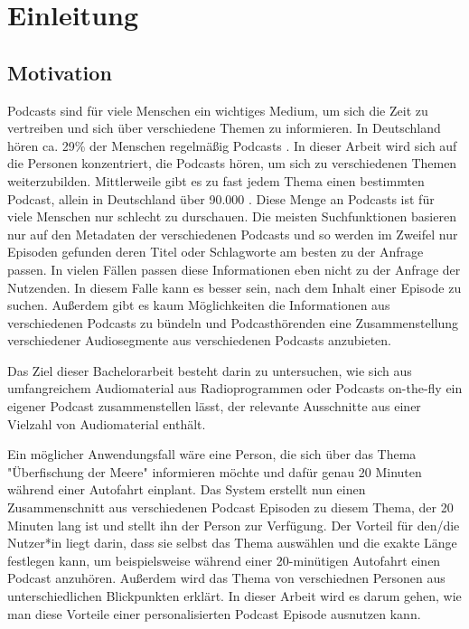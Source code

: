 \chapter{Einleitung}\label{ch:intro}

\section{Motivation}

Podcasts sind für viele Menschen ein wichtiges Medium, um sich die Zeit zu vertreiben und sich über verschiedene Themen zu informieren. 
In Deutschland hören ca. 29\% der Menschen regelmäßig Podcasts \cite{newman2022}.
In dieser Arbeit wird sich auf die Personen konzentriert, die Podcasts hören, um sich zu verschiedenen Themen weiterzubilden.
Mittlerweile gibt es zu fast jedem Thema einen bestimmten Podcast, allein in Deutschland über 90.000 \cite{listennotes}.
Diese Menge an Podcasts ist für viele Menschen nur schlecht zu durschauen.
Die meisten Suchfunktionen basieren nur auf den Metadaten der verschiedenen Podcasts und so werden im Zweifel nur Episoden gefunden deren Titel oder Schlagworte am besten zu der Anfrage passen.
In vielen Fällen passen diese Informationen eben nicht zu der Anfrage der Nutzenden.
In diesem Falle kann es besser sein, nach dem Inhalt einer Episode zu suchen.
Außerdem gibt es kaum Möglichkeiten die Informationen aus verschiedenen Podcasts zu bündeln und Podcasthörenden eine Zusammenstellung verschiedener Audiosegmente aus verschiedenen Podcasts anzubieten.

Das Ziel dieser Bachelorarbeit besteht darin zu untersuchen, wie sich aus umfangreichem Audiomaterial aus Radioprogrammen oder Podcasts on-the-fly ein eigener Podcast zusammenstellen lässt, der relevante Ausschnitte aus einer Vielzahl von Audiomaterial enthält.

Ein möglicher Anwendungsfall wäre eine Person, die sich über das Thema "Überfischung der Meere" informieren möchte und dafür genau 20 Minuten während einer Autofahrt einplant. 
Das System erstellt nun einen Zusammenschnitt aus verschiedenen Podcast Episoden zu diesem Thema, der 20 Minuten lang ist und stellt ihn der Person zur Verfügung. 
Der Vorteil für den/die Nutzer*in liegt darin, dass sie selbst das Thema auswählen und die exakte Länge festlegen kann, um beispielsweise während einer 20-minütigen Autofahrt einen Podcast anzuhören. 
Außerdem wird das Thema von verschiednen Personen aus unterschiedlichen Blickpunkten erklärt. 
In dieser Arbeit wird es darum gehen, wie man diese Vorteile einer personalisierten Podcast Episode ausnutzen kann.


